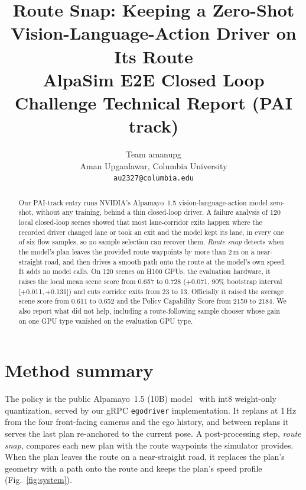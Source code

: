 \documentclass{article}
\title{Route Snap: Keeping a Zero-Shot Vision-Language-Action Driver on Its Route\\
\large AlpaSim E2E Closed Loop Challenge Technical Report (PAI track)}
\author{
  Team amanupg \\
  Aman Upganlawar, Columbia University \\
  \texttt{au2327@columbia.edu}
}
\begin{document}
\maketitle

\begin{abstract}
Our PAI-track entry runs NVIDIA's Alpamayo~1.5 vision-language-action model zero-shot, without any training,
behind a thin closed-loop driver. A failure analysis of 120 local closed-loop scenes showed that most
lane-corridor exits happen where the recorded driver changed lane or took an exit and the model kept its lane,
in every one of six flow samples, so no sample selection can recover them. \emph{Route snap} detects when the
model's plan leaves the provided route waypoints by more than 2\,m on a near-straight road, and then drives a
smooth path onto the route at the model's own speed. It adds no model calls. On 120 scenes on H100 GPUs, the
evaluation hardware, it raises the local mean scene score from 0.657 to 0.728 (+0.071, 90\% bootstrap interval
[+0.011,\,+0.131]) and cuts corridor exits from 23 to 13. Officially it raised the average scene score from 0.611 to 0.652 and the Policy Capability Score from 2150 to 2184. We also report what did not help, including a
route-following sample chooser whose gain on one GPU type vanished on the evaluation GPU type.
\end{abstract}

\section{Method summary}
The policy is the public Alpamayo~1.5 (10B) model~\cite{alpamayo15} with int8 weight-only quantization, served by
our gRPC \texttt{egodriver} implementation. It replans at 1\,Hz from the four front-facing cameras and the ego
history, and between replans it serves the last plan re-anchored to the current pose. A post-processing step,
\emph{route snap}, compares each new plan with the route waypoints the simulator provides. When the plan leaves the
route on a near-straight road, it replaces the plan's geometry with a path onto the route and keeps the plan's speed
profile (Fig.~\ref{fig:system}).
\end{document}
